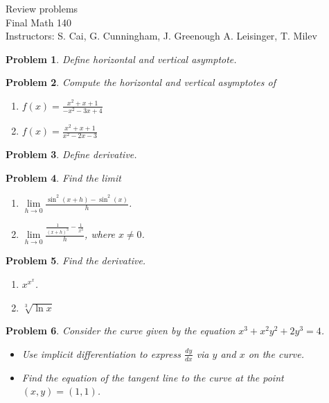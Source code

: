 \documentclass{article}
\newtheorem{problem}{Problem}
\begin{document}
\begin{center}
\Large
Review problems \\
Final Math 140 \\
\normalsize Instructors: S. Cai, G. Cunningham, J. Greenough A. Leisinger, T. Milev
\end{center}
\begin{problem}
Define horizontal and vertical asymptote.
\end{problem}
\begin{problem}
Compute the horizontal and vertical asymptotes of
\begin{enumerate}
\item $
\displaystyle
f(x)=\frac{x^2+x+1}{-x^2- 3x+ 4}
$
\hfill{~}
\item $
\displaystyle
f(x)=\frac{x^2+x+1}{x^2- 2x- 3}
$
\hfill{~}
\end{enumerate}
\end{problem}
\begin{problem}
Define derivative.
\end{problem}
\begin{problem}
Find the limit
\begin{enumerate}
\item $\displaystyle \lim\limits_{h\to 0} \frac{ \sin^2 (x+h)-\sin^2 (x)}{h}$.
\hfill{~}
\item $\displaystyle \lim\limits_{h\to 0} \frac{ \frac{1}{(x+h)^3}-\frac{1}{x^3}}{h}$, where $x\neq 0$.
\hfill{~}
\end{enumerate}
\end{problem}

\begin{problem}Find the derivative.
\begin{enumerate}
\item
 $x^{x^x} $.
\hfill{~}
\item $\sqrt[3]{\ln x}$
\hfill{~}
\end{enumerate}
\end{problem}

\begin{problem}
Consider the curve given by the equation $x^3+ x^2y^2+2y^3=4$.
\begin{itemize}
\item Use implicit differentiation to express $\frac{dy}{dx}$ via $y $ and $x$ on the curve.
\item Find the equation of the tangent line to the curve at the point $(x,y)=(1,1)$.
\end{itemize}
\end{problem}
\end{document}
